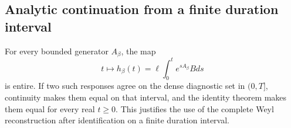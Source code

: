 \subsection{Analytic continuation from a finite duration interval}

For every bounded generator \(A_\beta\), the map
\[
 t\mapsto h_\beta(t)=\ell\int_0^te^{sA_\beta}Bds
\]
is entire.  If two such responses agree on the dense diagnostic set in
\((0,T]\), continuity makes them equal on that interval, and the identity
theorem makes them equal for every real \(t\ge0\).  This justifies the use of
the complete Weyl reconstruction after identification on a finite duration
interval.
